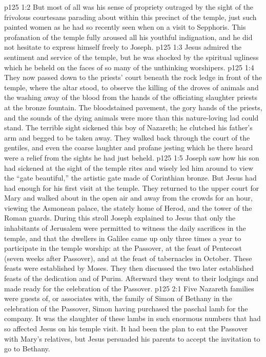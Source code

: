 \vs p125 1:2 But most of all was his sense of propriety outraged by the sight of the frivolous courtesans parading about within this precinct of the temple, just such painted women as he had so recently seen when on a visit to Sepphoris. This profanation of the temple fully aroused all his youthful indignation, and he did not hesitate to express himself freely to Joseph.
\vs p125 1:3 Jesus admired the sentiment and service of the temple, but he was shocked by the spiritual ugliness which he beheld on the faces of so many of the unthinking worshipers.
\vs p125 1:4 They now passed down to the priests’ court beneath the rock ledge in front of the temple, where the altar stood, to observe the killing of the droves of animals and the washing away of the blood from the hands of the officiating slaughter priests at the bronze fountain. The bloodstained pavement, the gory hands of the priests, and the sounds of the dying animals were more than this nature\hyp{}loving lad could stand. The terrible sight sickened this boy of Nazareth; he clutched his father’s arm and begged to be taken away. They walked back through the court of the gentiles, and even the coarse laughter and profane jesting which he there heard were a relief from the sights he had just beheld.
\vs p125 1:5 Joseph saw how his son had sickened at the sight of the temple rites and wisely led him around to view the “gate beautiful,” the artistic gate made of Corinthian bronze. But Jesus had had enough for his first visit at the temple. They returned to the upper court for Mary and walked about in the open air and away from the crowds for an hour, viewing the Asmonean palace, the stately home of Herod, and the tower of the Roman guards. During this stroll Joseph explained to Jesus that only the inhabitants of Jerusalem were permitted to witness the daily sacrifices in the temple, and that the dwellers in Galilee came up only three times a year to participate in the temple worship: at the Passover, at the feast of Pentecost (seven weeks after Passover), and at the feast of tabernacles in October. These feasts were established by Moses. They then discussed the two later established feasts of the dedication and of Purim. Afterward they went to their lodgings and made ready for the celebration of the Passover.
\vs p125 2:1 Five Nazareth families were guests of, or associates with, the family of Simon of Bethany in the celebration of the Passover, Simon having purchased the paschal lamb for the company. It was the slaughter of these lambs in such enormous numbers that had so affected Jesus on his temple visit. It had been the plan to eat the Passover with Mary’s relatives, but Jesus persuaded his parents to accept the invitation to go to Bethany.

